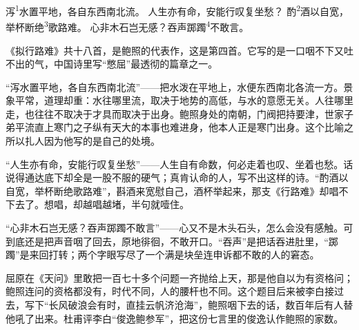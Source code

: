 
\begin{poem}
泻\textsuperscript{1}水置平地，各自东西南北流。
人生亦有命，安能行叹复坐愁？
酌\textsuperscript{2}酒以自宽，举杯断绝\textsuperscript{3}歌路难。
心非木石岂无感？吞声踯躅\textsuperscript{4}不敢言。
\end{poem}

\begin{annotations}
\end{annotations}

\begin{appreciation}
《拟行路难》共十八首，是鲍照的代表作，这是第四首。它写的是一口咽不下又吐不出的气，中国诗里写“憋屈”最透彻的篇章之一。

“泻水置平地，各自东西南北流”——把水泼在平地上，水便东西南北各流一方。景象平常，道理却重：水往哪里流，取决于地势的高低，与水的意愿无关。人往哪里走，也往往不取决于才具而取决于出身。鲍照身处的南朝，门阀把持要津，世家子弟平流直上寒门之子纵有天大的本事也难进身，他本人正是寒门出身。这个比喻之所以扎人因为他写的是自己的处境。

“人生亦有命，安能行叹复坐愁”——人生自有命数，何必走着也叹、坐着也愁。话说得通达底下却全是一股不服的硬气；真肯认命的人，写不出这样的诗。“酌酒以自宽，举杯断绝歌路难”，斟酒来宽慰自己，酒杯举起来，那支《行路难》却唱不下去了。想唱，却越唱越堵，半句就噎住。

“心非木石岂无感？吞声踯躅不敢言”——心又不是木头石头，怎么会没有感触。可到底还是把声音咽了回去，原地徘徊，不敢开口。“吞声”是把话吞进肚里，“踯躅”是来回打转；两个字眼写尽了一个满是块垒连申诉都不敢的人的窘态。

屈原在《天问》里敢把一百七十多个问题一齐抛给上天，那是他自以为有资格问；鲍照连问的资格都没有，时代不同，人的腰杆也不同。这个题目后来被李白接过去，写下“长风破浪会有时，直挂云帆济沧海”，鲍照咽下去的话，数百年后有人替他吼了出来。杜甫评李白“俊逸鲍参军”，把这份七言里的俊逸认作鲍照的家数。
\end{appreciation}
